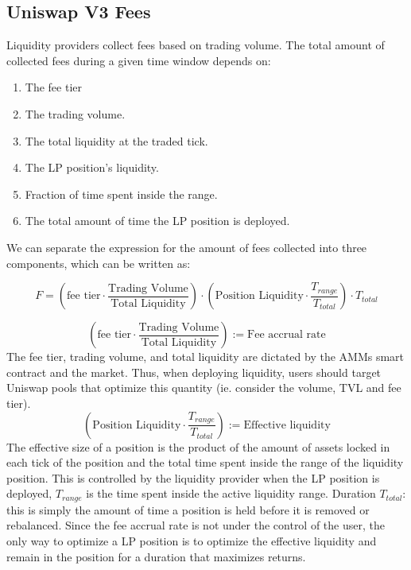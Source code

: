 \documentclass{article}
\begin{document}
\subsection{Uniswap V3 Fees}
Liquidity providers collect fees based on trading volume. The total amount of collected fees during a given time window depends on:
\begin{enumerate}
    \item The fee tier
    \item The trading volume.
    \item The total liquidity at the traded tick.
    \item The LP position’s liquidity.
    \item Fraction of time spent inside the range.
    \item The total amount of time the LP position is deployed.
\end{enumerate}

We can separate the expression for the amount of fees collected into three components, which can be written as:

\begin{equation}
    F = (\text{fee tier}\cdot \frac{\text{Trading Volume}}{\text{Total Liquidity}})\cdot (\text{Position Liquidity}\cdot \frac{T_{range}}{T_{total}})\cdot T_{total}
    \label{eq:LP_returns}
\end{equation}

$$(\text{fee tier}\cdot \frac{\text{Trading Volume}}{\text{Total Liquidity}}):= \text{Fee accrual rate}$$ 
The fee tier, trading volume, and total liquidity are dictated by the AMMs smart contract and the market. Thus, when deploying liquidity, users should target Uniswap pools that optimize this quantity (ie. consider the volume, TVL and fee tier).
$$(\text{Position Liquidity}\cdot \frac{T_{range}}{T_{total}}):=\text{Effective liquidity}$$
The effective size of a position is the product of the amount of assets locked in each tick of the position and the total time spent inside the range of the liquidity position. This is controlled by the liquidity provider when the LP position is deployed, $T_{range}$ is the time spent inside the active liquidity range.
Duration $T_{total}$: this is simply the amount of time a position is held before it is removed or rebalanced. \newline
Since the fee accrual rate is not under the control of the user, the only way to optimize a LP position is to optimize the effective liquidity and remain in the position for a duration that maximizes returns.
\end{document}
